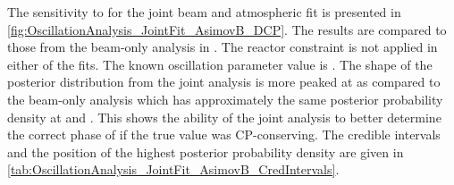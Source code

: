 The sensitivity to  for the joint beam and atmospheric fit is presented in \autoref{fig:OscillationAnalysis_JointFit_AsimovB_DCP}. The results are compared to those from the beam-only analysis in \cite{t2k_tn_399}. The reactor constraint is not applied in either of the fits. The known oscillation parameter value is . The shape of the posterior distribution from the joint analysis is more peaked at  as compared to the beam-only analysis which has approximately the same posterior probability density at  and . This shows the ability of the joint analysis to better determine the correct phase of  if the true value was CP-conserving. The \quickmath{1\sigma} credible intervals and the position of the highest posterior probability density are given in \autoref{tab:OscillationAnalysis_JointFit_AsimovB_CredIntervals}. 

